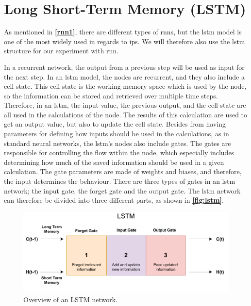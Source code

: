 \section{Long Short-Term Memory (LSTM)}

As mentioned in \textbf{\autoref{rnn1}}, there are different types of \gls{rnn}s, but the \gls{lstm} model is one of the most widely used in regards to \gls{ips}. We will therefore also use the \gls{lstm} structure for our experiment with \gls{rnn}.

In a recurrent network, the output from a previous step will be used as input for the next step. In an \gls{lstm} model, the nodes are recurrent, and they also include a cell state. This cell state is the working memory space which is used by the node, so the information can be stored and retrieved over multiple time steps. Therefore, in an \gls{lstm}, the input value, the previous output, and the cell state are all used in the calculations of the node. The results of this calculation are used to get an output value, but also to update the cell state. Besides from having parameters for defining how inputs should be used in the calculations, as in standard neural networks, the \gls{lstm}'s nodes also include gates. The gates are responsible for controlling the flow within the node, which especially includes determining how much of the saved information should be used in a given calculation. The gate parameters are made of weights and biases, and therefore, the input determines the behaviour. There are three types of gates in an \gls{lstm} network; the input gate, the forget gate and the output gate. The \gls{lstm} network can therefore be divided into three different parts, as shown in \textbf{\autoref{fig:lstm}}. 

\begin{figure}[H]
    \centering
    \includegraphics[scale=0.85]{Images/Experiments/lstm.pdf}
    \caption{Overview of an LSTM network.}
    \label{fig:lstm}
\end{figure}

